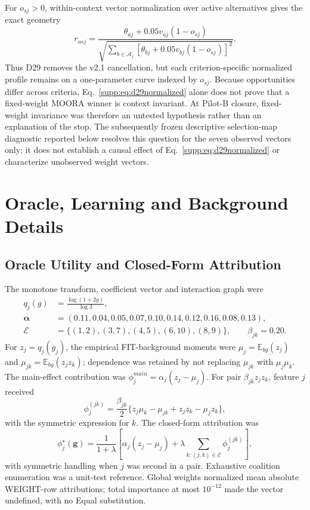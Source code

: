 \documentclass[runningheads,orivec]{llncs}
\newcommand{\E}{\mathbb{E}}
\begin{document}
For $o_{sj}>0$, within-context vector normalization over active alternatives gives the exact
geometry
\begin{equation}
r_{asj}=
\frac{\theta_{aj}+0.05v_{aj}(1-o_{sj})}
{\sqrt{\sum_{b\in\mathcal A_j}
[\theta_{bj}+0.05v_{bj}(1-o_{sj})]^2}}.
\label{supp:eq:d29normalized}
\end{equation}
Thus D29 removes the v2.1 cancellation, but each criterion-specific normalized profile remains
on a one-parameter curve indexed by $o_{sj}$. Because opportunities differ across criteria,
Eq.~\eqref{supp:eq:d29normalized} alone does not prove that a fixed-weight MOORA winner is
context invariant. At Pilot-B closure, fixed-weight invariance was therefore an untested
hypothesis rather than an explanation of the stop. The subsequently frozen descriptive
selection-map diagnostic reported below resolves this question for the seven observed vectors
only; it does not establish a causal effect of Eq.~\eqref{supp:eq:d29normalized} or characterize
unobserved weight vectors.

\section{Oracle, Learning and Background Details}

\subsection{Oracle Utility and Closed-Form Attribution}

The monotone transform, coefficient vector and interaction graph were
\begin{align}
q_j(g)&=\frac{\log(1+2g)}{\log3},\nonumber\\
\boldsymbol\alpha&=(0.11,0.04,0.05,0.07,0.10,0.14,0.12,0.16,0.08,0.13),\nonumber\\
\mathcal E&=\{(1,2),(3,7),(4,5),(6,10),(8,9)\},\qquad \beta_{jk}=0.20.
\label{supp:eq:oraclecomponents}
\end{align}
For $z_j=q_j(g_j)$, the empirical FIT-background moments were
$\mu_j=\E_{bg}(z_j)$ and $\mu_{jk}=\E_{bg}(z_jz_k)$; dependence was retained by not replacing
$\mu_{jk}$ with $\mu_j\mu_k$. The main-effect contribution was
$\phi_j^{main}=\alpha_j(z_j-\mu_j)$. For pair $\beta_{jk}z_jz_k$, feature $j$ received
\begin{equation}
\phi_j^{(jk)}=\frac{\beta_{jk}}{2}
\{z_j\mu_k-\mu_{jk}+z_jz_k-\mu_jz_k\},
\label{supp:eq:pairshap}
\end{equation}
with the symmetric expression for $k$. The closed-form attribution was
\begin{equation}
\phi_j^\star(\mathbf g)=\frac{1}{1+\lambda}
\left[\alpha_j(z_j-\mu_j)+\lambda\!\sum_{k:(j,k)\in\mathcal E}\phi_j^{(jk)}\right],
\label{supp:eq:closedshap}
\end{equation}
with symmetric handling when $j$ was second in a pair. Exhaustive coalition enumeration was a
unit-test reference. Global weights normalized mean absolute WEIGHT-row attributions; total
importance at most $10^{-12}$ made the vector undefined, with no Equal substitution.
\end{document}
